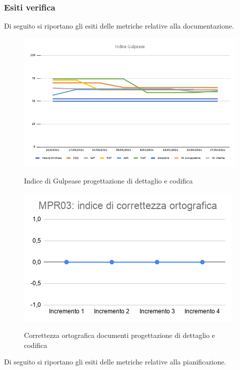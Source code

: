 \subsubsection{Esiti verifica}
Di seguito si riportano gli esiti delle metriche relative alla documentazione.
\begin{figure}[h]
	\centering
	\includegraphics[scale=0.5]{Immagini/GulpeaseDettaglio}\\
	\caption{Indice di Gulpease progettazione di dettaglio e codifica}
	\label{fig:GulpeasePDettaglio}
\end{figure}
\begin{figure}[h]
	\centering
	\includegraphics[scale=0.6]{Immagini/MPR03_cortograficadettaglio.png}\\
	\caption{Correttezza ortografica documenti progettazione di dettaglio e codifica}
	\label{fig:CortOrtograficaPDettaglio}
\end{figure}
\newpage
{}
Di seguito si riportano gli esiti delle metriche relative alla pianificazione.
